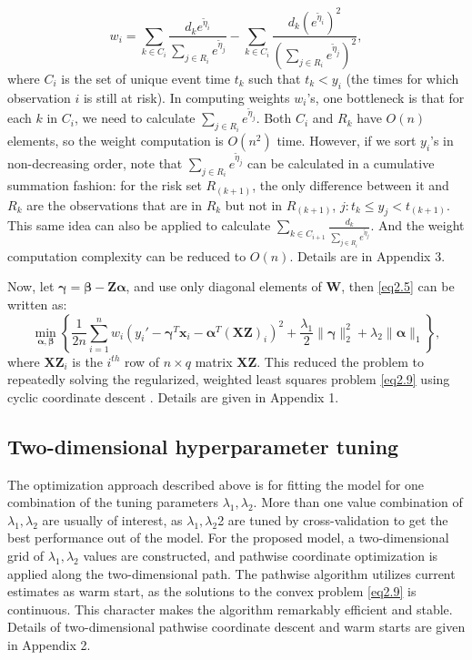 \begin{equation}
    w_i=\sum_{k\in C_i}\frac{d_k e^{\tilde{\eta}_i}}{\sum_{j\in R_i}e^{\tilde{\eta}_j}}-\sum_{k\in C_i}\frac{d_k (e^{\tilde{\eta}_i})^2}{(\sum_{j\in R_i}e^{\tilde{\eta}_j})^2}, \label{eq2.8}
\end{equation}
where $C_i$ is the set of unique event time $t_k$ such that $t_k<y_i$ (the times for which observation $i$ is still at risk). In computing weights $w_i$’s, one bottleneck is that for each $k$ in $C_i$, we need to calculate $\sum_{j\in R_i}e^{\tilde{\eta}_j}$. Both $C_i$ and $R_k$ have $O(n)$ elements, so the weight computation is $O(n^2 )$ time. However, if we sort $y_i$’s in non-decreasing order, note that $\sum_{j\in R_i}e^{\tilde{\eta}_j}$ can be calculated in a cumulative summation fashion: for the risk set $R_(k+1)$, the only difference between it and $R_k$ are the observations that are in $R_k$ but not in $R_(k+1)$, ${j: t_k\leq y_j<t_(k+1)}$. This same idea can also be applied to calculate $\sum_{k\in C_{i+1}}\frac{d_k}{\sum_{j\in R_i}e^{\tilde{\eta}_j}}$. And the weight computation complexity can be reduced to $O(n)$. Details are in Appendix 3.

Now, let $\bm{\gamma}=\bm{\beta}-\bm{Z\alpha}$, and use only diagonal elements of $\bm{W}$, then \eqref{eq2.5} can be written as:
\begin{equation}
    \min_{\bm{\alpha},\bm{\beta}} \left\{ \frac{1}{2n} \sum_{i=1}^n w_i(y_i'-\bm{\gamma}^T\bm{x}_i-\bm{\alpha}^T(\bm{XZ})_i)^2+\frac{\lambda_1}{2}\|\bm{\gamma}\|_2^2+\lambda_2\|\bm{\alpha}\|_1 \right\}, \label{eq2.9}
\end{equation}
where $\bm{XZ}_i$ is the $i^{th}$ row of $n\times q$ matrix $\bm{XZ}$. This reduced the problem to repeatedly solving the regularized, weighted least squares problem \eqref{eq2.9} using cyclic coordinate descent \citep{friedman2010regularization}. Details are given in Appendix 1.

\subsection{Two-dimensional hyperparameter tuning}
The optimization approach described above is for fitting the model for one combination of the tuning parameters $\lambda_1,\lambda_2$. More than one value combination of $\lambda_1,\lambda_2$ are usually of interest, as $\lambda_1,\lambda_2$2 are tuned by cross-validation to get the best performance out of the model. For the proposed model, a two-dimensional grid of $\lambda_1,\lambda_2$ values are constructed, and pathwise coordinate optimization \citep{friedman2007pathwise} is applied along the two-dimensional path. The pathwise algorithm utilizes current estimates as warm start, as the solutions to the convex problem \eqref{eq2.9} is continuous. This character makes the algorithm remarkably efficient and stable. Details of two-dimensional pathwise coordinate descent and warm starts are given in Appendix 2.

